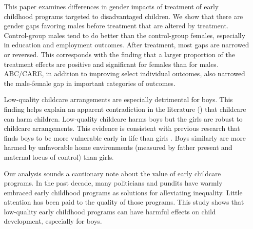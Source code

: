 This paper examines differences in gender impacts of treatment of early childhood programs targeted to disadvantaged children. We show that there are gender gaps favoring males before treatment that are altered by treatment. Control-group males tend to do better than the control-group females, especially in education and employment outcomes. After treatment, most gaps are narrowed or reversed. This corresponds with the finding that a larger proportion of the treatment effects are positive and significant for females than for males. ABC/CARE, in addition to improving select individual outcomes, also narrowed the male-female gap in important categories of outcomes.

Low-quality childcare arrangements are especially detrimental for boys. This finding helps explain an apparent contradiction in the literature (\citet{Baker_Gruber_etal_2008_JPE,Baker_Gruber_Milligan_2015_Noncog_Defects,Kottelenberg-Lehrer_2014_Gender-Effects}) that childcare can harm children. Low-quality childcare harms boys but the girls are robust to childcare arrangements. This evidence is consistent with previous research that finds boys to be more vulnerable early in life than girls \citep{golding2016psychology}. Boys similarly are more harmed by unfavorable home environments (measured by father present and maternal locus of control) than girls.

Our analysis sounds a cautionary note about the value of early childcare programs. In the past decade, many politicians and pundits have warmly embraced early childhood programs as solutions for alleviating inequality. Little attention has been paid to the quality of those programs. This study shows that low-quality early childhood programs can have harmful effects on child development, especially for boys.

